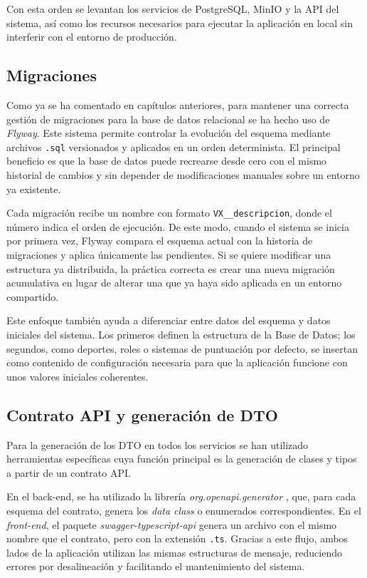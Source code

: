 Con esta orden se levantan los servicios de PostgreSQL, MinIO y la API del sistema, así como los recursos necesarios para ejecutar la aplicación en local sin interferir con el entorno de producción.

\subsection{Migraciones}

Como ya se ha comentado en capítulos anteriores, para mantener una correcta gestión de migraciones para la base de datos relacional se ha hecho uso de \emph{Flyway}. Este sistema permite controlar la evolución del esquema mediante archivos \texttt{.sql} versionados y aplicados en un orden determinista. El principal beneficio es que la base de datos puede recrearse desde cero con el mismo historial de cambios y sin depender de modificaciones manuales sobre un entorno ya existente.

Cada migración recibe un nombre con formato \texttt{VX\_\_descripcion}, donde el número indica el orden de ejecución. De este modo, cuando el sistema se inicia por primera vez, Flyway compara el esquema actual con la historia de migraciones y aplica únicamente las pendientes. Si se quiere modificar una estructura ya distribuida, la práctica correcta es crear una nueva migración acumulativa en lugar de alterar una que ya haya sido aplicada en un entorno compartido.

Este enfoque también ayuda a diferenciar entre datos del esquema y datos iniciales del sistema. Los primeros definen la estructura de la Base de Datos; los segundos, como deportes, roles o sistemas de puntuación por defecto, se insertan como contenido de configuración necesaria para que la aplicación funcione con unos valores iniciales coherentes.

\subsection{Contrato API y generación de DTO}
Para la generación de los \ac{DTO} en todos los servicios se han utilizado herramientas específicas cuya función principal es la generación de clases y tipos a partir de un contrato API.

En el back-end, se ha utilizado la librería \emph{org.openapi.generator} \cite{plugin:openapi-generator}, que, para cada esquema del contrato, genera los \emph{data class} o enumerados correspondientes. En el \emph{front-end}, el paquete \emph{swagger-typescript-api} \cite{npm:swagger-typescript-api} genera un archivo con el mismo nombre que el contrato, pero con la extensión \texttt{.ts}. Gracias a este flujo, ambos lados de la aplicación utilizan las mismas estructuras de mensaje, reduciendo errores por desalineación y facilitando el mantenimiento del sistema.


